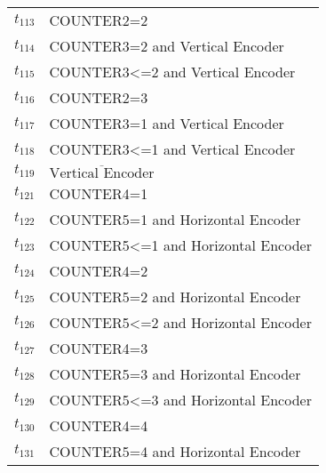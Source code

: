 \begin{longtable}{M{5cm}M{10cm}}
\hyperlink{completeNet:t113}{\hypertarget{completeTable:t113}{$t_{113}$}} & COUNTER2=2\\
\hyperlink{completeNet:t114}{\hypertarget{completeTable:t114}{$t_{114}$}} & COUNTER3=2 and Vertical Encoder\\
\hyperlink{completeNet:t115}{\hypertarget{completeTable:t115}{$t_{115}$}} & COUNTER3<=2 and Vertical Encoder\\
\hyperlink{completeNet:t116}{\hypertarget{completeTable:t116}{$t_{116}$}} & COUNTER2=3\\
\hyperlink{completeNet:t117}{\hypertarget{completeTable:t117}{$t_{117}$}} & COUNTER3=1 and Vertical Encoder\\
\hyperlink{completeNet:t118}{\hypertarget{completeTable:t118}{$t_{118}$}} & COUNTER3<=1 and Vertical Encoder\\
\hyperlink{completeNet:t119}{\hypertarget{completeTable:t119}{$t_{119}$}} & \(\overline{\mbox{Vertical Encoder}}\)\\
\hyperlink{completeNet:t121}{\hypertarget{completeTable:t121}{$t_{121}$}} & COUNTER4=1\\
\hyperlink{completeNet:t122}{\hypertarget{completeTable:t122}{$t_{122}$}} & COUNTER5=1 and Horizontal Encoder\\
\hyperlink{completeNet:t123}{\hypertarget{completeTable:t123}{$t_{123}$}} & COUNTER5<=1 and Horizontal Encoder\\
\hyperlink{completeNet:t124}{\hypertarget{completeTable:t124}{$t_{124}$}} & COUNTER4=2\\
\hyperlink{completeNet:t125}{\hypertarget{completeTable:t125}{$t_{125}$}} & COUNTER5=2 and Horizontal Encoder\\
\hyperlink{completeNet:t126}{\hypertarget{completeTable:t126}{$t_{126}$}} & COUNTER5<=2 and Horizontal Encoder\\
\hyperlink{completeNet:t127}{\hypertarget{completeTable:t127}{$t_{127}$}} & COUNTER4=3\\
\hyperlink{completeNet:t128}{\hypertarget{completeTable:t128}{$t_{128}$}} & COUNTER5=3 and Horizontal Encoder\\
\hyperlink{completeNet:t129}{\hypertarget{completeTable:t129}{$t_{129}$}} & COUNTER5<=3 and Horizontal Encoder\\
\hyperlink{completeNet:t130}{\hypertarget{completeTable:t130}{$t_{130}$}} & COUNTER4=4\\
\hyperlink{completeNet:t131}{\hypertarget{completeTable:t131}{$t_{131}$}} & COUNTER5=4 and Horizontal Encoder\\

\end{longtable}
